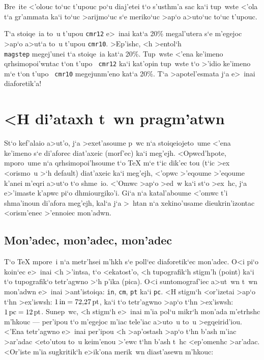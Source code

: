 \exercise Bre~ite <'olouc to`uc t'upouc po`u diaj'etei t`o s'usthm'a sac
ka`i tup~wste <'ola t`a gr'ammata ka`i to`uc >arijmo`uc s`e meriko`uc
>ap`o a>uto`uc to`uc t'upouc.

\exercise T`a stoiqe~ia to~u t'upou {\tt cmr12} e>~inai kat`a 20\NB{}\%
megal'utera s`e m'egejoc >ap`o a>ut`a to~u t'upou {\tt cmr10}. 
>Ep'ishc, <h >entol`h {\tt \\magstep{}} megej'unei t`a stoiqe~ia
kat`a 20\NB \%. Tup~wste <'ena ke'imeno qrhsimopoi'wntac t`on t'upo {\tt
cmr12} ka`i kat'opin tup~wste t`o >'idio ke'imeno m`e t`on t'upo {\tt
cmr10} megejunm'eno kat`a 20\NB{}\%.  T`a >apotel'esmata j`a e>~inai
diaforetik'a!


\section{<H di'ataxh t~wn pragm'atwn}

St`o kef'alaio a>ut'o, j`a >exet'asoume p~wc n`a stoiqeiojeto~ume <'ena
ke'imeno s`e di'a\-forec diat'axeic (morf'ec) ka`i meg'ejh.
<Opwc\-d'hpote, mporo~ume n`a qrhsimopoi'hsoume t`o {\rm \TeX} m`e t`ic
dik'ec tou (t`ic {\tengs >ex <orismo~u\/} >`h {\rm default}) diat'axeic
ka`i meg'ejh, <'opwc >'eqoume >'eqoume k'anei m'eqri a>ut`o t`o shme~io.
<'Omwc >ap`o >ed~w ka`i st`o >ex~hc, j`a e>'imaste k'apwc pi`o
dhmiourgiko'i.  Gi`a n`a katal'aboume <'omwc t'i shma'inoun di'afora
meg'ejh, kal`a j`a >~htan n`a xekino'usame di\-eu\-kri\-n'izontac
<orism'enec >'ennoiec mon'adwn.

\subsection{Mon'adec, mon'adec, mon'adec}

T`o {\rm \TeX} mpore~i n`a metr'hsei m'hkh s`e poll`ec diaforetik`ec
mon'adec.  O<i pi`o koin`ec e>~inai <h >'intsa, t`o <ekatost'o, <h
tupografik`h stigm'h ({\rm point}) ka`i t`o tupo\-gra\-fik`o
te\-tr'a\-gwno >`h p'ika ({\rm pica}). O<i sunto\-mo\-graf'iec a>ut~wn
t~wn mon'adwn e>~inai >ant'istoiqa: {\tt in}, {\tt cm}, {\tt pt} ka`i
{\tt pc}.  <H stigm`h <or'izetai >ap`o t`hn >ex'iswsh: $1\,\rm in =
72{,}27\,\rm pt$, ka`i t`o te\-tr'a\-gwno >ap`o t`hn >ex'iswsh: $1\,\rm
pc = 12\,\rm pt$\null.  Sunep~wc, <h stigm`h e>~inai m'ia pol`u mikr`h
mon'ada m'etrhshc m'hkouc --- per'ipou t`o m'egejoc m'iac tele'iac
a>uto~u to~u >egqei\-rid'iou.   <'Ena te\-tr'a\-gwno e>~inai per'ipou <h
>ap'ostash >ap`o t`hn b'ash m'iac >ar'adac <eto'utou to~u keim'enou
>'ewc t`hn b'ash t~hc <ep'omenhc >ar'adac.  <Or'iste m'ia sug\-kritik`h
e>ik'ona merik~wn diast'asewn m'hkouc: \def\pip{\vrule height 4 true
pt}%

